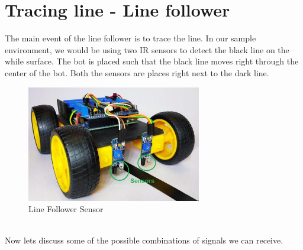 \section{Tracing line - Line follower}
The main event of the line follower is to trace the line. In our sample environment, we would be using two IR sensors to detect the black line on the while surface. The bot is placed such that the black line moves right through the center of the bot. Both the sensors are places right next to the dark line.
\begin{figure}
    \centering
    \includegraphics[width=3in]{Chapters/images/IR_linefollower_sensor.png}
     \caption{Line Follower Sensor}
\end{figure}
\\ Now lets discuss some of the possible combinations of signals we can receive.
